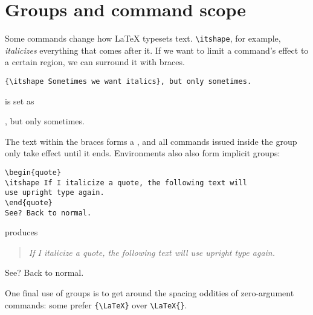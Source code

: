 \section{Groups and command scope}
Some commands change how \LaTeX{} typesets text.
\verb|\itshape|, for example, \textit{italicizes} everything that comes after it.
If we want to limit a command's effect to a certain region, we can surround it
with braces.
\begin{leftfigure}
\begin{lstlisting}
{\itshape Sometimes we want italics}, but only sometimes.
\end{lstlisting}
\end{leftfigure}
is set as
\begin{leftfigure}
, but only sometimes.
\end{leftfigure}
The text within the braces forms a ,
and all commands issued inside the group only take effect until it ends.
Environments also also form implicit groups:
\begin{leftfigure}
\begin{lstlisting}
\begin{quote}
\itshape If I italicize a quote, the following text will
use upright type again.
\end{quote}
See? Back to normal.
\end{lstlisting}
\end{leftfigure}
produces
\begin{leftfigure}
\lm
\begin{quote}
\itshape If I italicize a quote, the following text will
use upright type again.
\end{quote}
See? Back to normal.
\end{leftfigure}
One final use of groups is to get around the spacing oddities of zero-argument
commands: some prefer \verb|{\LaTeX}| over \verb|\LaTeX{}|.

